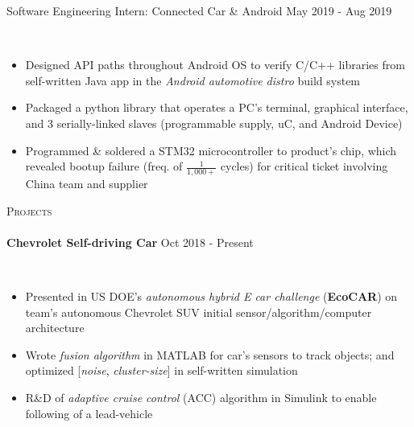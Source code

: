 \documentclass[a4paper]{article}
\newcommand{\lineunder} {
    \vspace*{-8pt} \\
    \hspace*{-18pt} \hrulefill \\
}
\newcommand{\header} [1] {
    {\hspace*{-18pt}\vspace*{6pt} \textsc{#1}}
    \vspace*{-6pt} \lineunder
}
\begin{document}
{Software Engineering Intern: Connected Car \& Android \hfill May 2019 - Aug 2019\\
\vspace{-2mm}
	\item[]
	\\
\vspace{-1mm}
\begin{itemize} \itemsep 1pt
    \item Designed API paths throughout Android OS  to verify C/C++ libraries from self-written Java app in the \textit{Android automotive distro} build system
    \item Packaged a python library that operates a PC's terminal, graphical interface, and 3 serially-linked slaves (programmable supply, uC, and Android Device)
    		  \item Programmed \& soldered a STM32 microcontroller to product's chip, which revealed bootup failure (freq. of $\frac{1}{1,000+}$ cycles) for critical ticket involving China team and supplier
\end{itemize}


\header{Projects}
\vspace{1mm}
\textbf{Chevrolet Self-driving Car} \hfill Oct 2018 - Present\\
\vspace{-2mm}
	\item[]
	\\
\vspace{-1mm}
\begin{itemize} \itemsep 1pt
	\item Presented in US DOE's \textit{autonomous hybrid E car challenge} (\textbf{EcoCAR}) on team's autonomous Chevrolet SUV initial sensor/algorithm/computer architecture  
    \item Wrote \textit{fusion algorithm} in MATLAB for car’s sensors to track objects; and optimized [\textit{noise}, \textit{cluster-size}] in self-written simulation
    \item R\&D of \textit{adaptive cruise control} (ACC) algorithm in Simulink to enable following of a lead-vehicle
\end{itemize}

}
\end{document}
